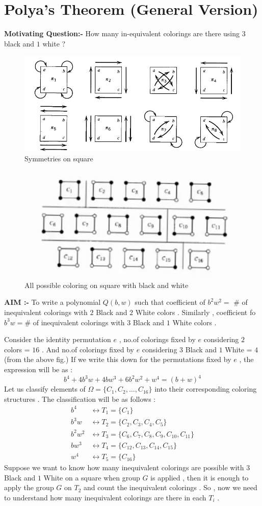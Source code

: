 \section{Polya's Theorem (General Version)}
\textbf{Motivating Question:- }How many in-equivalent colorings are there using $3$ black and $1$ white ? 
\begin{figure}[h!]
    \centering
    \includegraphics[width=0.6\linewidth]{images/Set-G.jpeg}
    \caption{Symmetries on square}
\end{figure}
\begin{figure}[h!]
    \centering
    \includegraphics[width=0.6\linewidth]{images/Square-colorings-black-white.png}
    \caption{All possible coloring on square with black and white}
\end{figure}

\textbf{AIM :-} To write a polynomial $Q(b,w)$ such that coefficient of $b^2w^2=$ \# of inequivalent colorings with $2$ Black and $2$ White colors . Similarly , coefficient fo $b^3w=$\# of inequivalent colorings with $3$ Black and $1$ White colors .

\qquad Consider the identity permutation $e$ , no.of colorings fixed by $e$ considering $2$ colors = $16$ . And no.of colorings fixed by $e$ considering $3$ Black and $1$ White = $4$ (from the above fig.)
If we write this down for the permutations fixed by $e$ , the expression will be as :
$$b^4+4b^3w+4bw^3+6b^2w^2+w^4=(b+w)^4$$
Let us classify elements of $\Omega=\{C_1,C_2,\dots,C_{16}\}$ into their corresponding coloring structures . The classification will be as follows :
\begin{align*}
    b^4 &\longleftrightarrow T_1=\{C_1\}\\
    b^3w &\longleftrightarrow T_2=\{C_2,C_3,C_4,C_5\}\\
    b^2w^2 &\longleftrightarrow T_3=\{C_6,C_7,C_8,C_9,C_{10},C_{11}\}\\
    bw^3 &\longleftrightarrow T_4=\{C_{12},C_{13},C_{14},C_{15}\}\\
    w^4 &\longleftrightarrow T_5=\{C_{16}\}
\end{align*}
Suppose we want to know how many inequivalent colorings are possible with $3$ Black and $1$ White on a square when group $G$ is applied , then it is enough to apply the group $G$ on $T_2$ and count the inequivalent colorings . So , now we need to understand how many inequivalent colorings are there in each $T_i$ .

